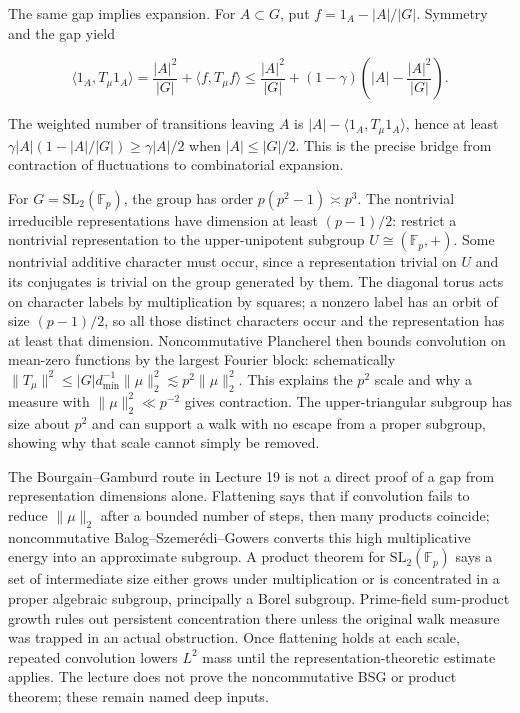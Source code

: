 The same gap implies expansion. For \(A\subset G\), put \(f=1_A-|A|/|G|\). Symmetry and the gap yield

\[\langle1_A,T_\mu1_A\rangle
=\frac{|A|^2}{|G|}+\langle f,T_\mu f\rangle
\le\frac{|A|^2}{|G|}+(1-\gamma)\left(|A|-\frac{|A|^2}{|G|}\right).\]

The weighted number of transitions leaving \(A\) is \(|A|-\langle1_A,T_\mu1_A\rangle\), hence at least \(\gamma|A|(1-|A|/|G|)\ge\gamma|A|/2\) when \(|A|\le|G|/2\). This is the precise bridge from contraction of fluctuations to combinatorial expansion.

For \(G=\mathrm{SL}_2(\mathbb F_p)\), the group has order \(p(p^2-1)\asymp p^3\). The nontrivial irreducible representations have dimension at least \((p-1)/2\): restrict a nontrivial representation to the upper-unipotent subgroup \(U\cong(\mathbb F_p,+)\). Some nontrivial additive character must occur, since a representation trivial on \(U\) and its conjugates is trivial on the group generated by them. The diagonal torus acts on character labels by multiplication by squares; a nonzero label has an orbit of size \((p-1)/2\), so all those distinct characters occur and the representation has at least that dimension. Noncommutative Plancherel then bounds convolution on mean-zero functions by the largest Fourier block: schematically \(\|T_\mu\|^2\le |G|d_{\min}^{-1}\|\mu\|_2^2\lesssim p^2\|\mu\|_2^2\). This explains the \(p^2\) scale and why a measure with \(\|\mu\|_2^2\ll p^{-2}\) gives contraction. The upper-triangular subgroup has size about \(p^2\) and can support a walk with no escape from a proper subgroup, showing why that scale cannot simply be removed.

The Bourgain--Gamburd route in Lecture 19 is not a direct proof of a gap from representation dimensions alone. Flattening says that if convolution fails to reduce \(\|\mu\|_2\) after a bounded number of steps, then many products coincide; noncommutative Balog--Szemerédi--Gowers converts this high multiplicative energy into an approximate subgroup. A product theorem for \(\mathrm{SL}_2(\mathbb F_p)\) says a set of intermediate size either grows under multiplication or is concentrated in a proper algebraic subgroup, principally a Borel subgroup. Prime-field sum-product growth rules out persistent concentration there unless the original walk measure was trapped in an actual obstruction. Once flattening holds at each scale, repeated convolution lowers \(L^2\) mass until the representation-theoretic estimate applies. The lecture does not prove the noncommutative BSG or product theorem; these remain named deep inputs.

